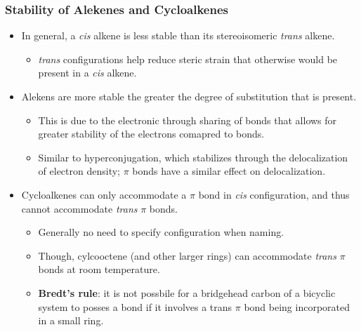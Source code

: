 \documentclass[12pt,a4paper]{article}
\begin{document}
\begin{itemize}
    \subsubsection{Stability of Alekenes and Cycloalkenes}
    \begin{itemize}
        \item In general, a \textit{cis} alkene is {\color{pos}less stable} than its stereoisomeric \textit{trans} alkene.
            \begin{itemize}
                \item \textit{trans} configurations help reduce steric strain that otherwise would be present in a \textit{cis} alkene.
            \end{itemize}
        \item Alekens are {\color{neg}more stable} the greater the degree of substitution that is present.
            \begin{itemize}
                \item This is due to the electronic through sharing of  bonds that allows for greater stability of the electrons comapred to  bonds.
                \item Similar to hyperconjugation, which stabilizes through the delocalization of electron density; $\pi$ bonds have a similar effect on delocalization.
            \end{itemize}
        \item Cycloalkenes can only accommodate a $\pi$ bond in \textit{cis} configuration, and thus cannot accommodate \textit{trans} $\pi$ bonds.
            \begin{itemize}
                \item Generally no need to specify configuration when naming.
                \item Though, cylcooctene (and other larger rings) can accommodate \textit{trans} $\pi$ bonds at room temperature.
                \item \textbf{Bredt's rule}: it is not possbile for a bridgehead carbon of a bicyclic system to posses a  bond if it involves a trans $\pi$ bond being incorporated in a small ring.
            \end{itemize}
    \end{itemize}

\end{itemize}
\end{document}

